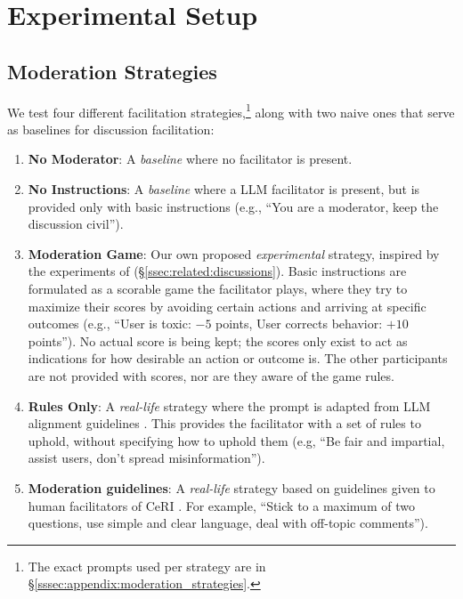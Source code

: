 \section{Experimental Setup}
\label{sec:experimental}

\subsection{Moderation Strategies}
\label{ssec:experimental:strategies}

We test four different facilitation strategies,\footnote{The exact prompts used per strategy are in \S\ref{sssec:appendix:moderation_strategies}.} along with two naive ones that serve as baselines for discussion facilitation:

\begin{enumerate}
    \item \textbf{No Moderator}: A \emph{baseline} where no facilitator is present.

    \item \textbf{No Instructions}: A \emph{baseline} where a \ac{LLM} facilitator is present, but is provided only with basic instructions (e.g., “You are a moderator, keep the discussion civil”).

     \item \textbf{Moderation Game}: Our own proposed \emph{experimental} strategy, inspired by the experiments of \citet{abdelnabi_negotiations} (\S\ref{ssec:related:discussions}). Basic instructions are formulated as a scorable game the facilitator plays, where they try to maximize their scores by avoiding certain actions and arriving at specific outcomes (e.g., “User is toxic: $-5$ points, User corrects behavior: $+10$ points”). No actual score is being kept; the scores only exist to act as indications for how desirable an action or outcome is. The other participants are not provided with scores, nor are they aware of the game rules.

    \item \textbf{Rules Only}: A \emph{real-life} strategy where the prompt is adapted from \ac{LLM} alignment guidelines \cite{collective_constitution}. This provides the facilitator with a set of rules to uphold, without specifying how to uphold them (e.g, “Be fair and impartial, assist users, don't spread misinformation”).

    \item \textbf{Moderation guidelines}: A \emph{real-life} strategy based on guidelines given to human facilitators of \ac{CeRI} \citep{Cornell_eRulemaking2017}. For example, “Stick to a maximum of two questions, use simple and clear language, deal with off-topic comments”). %


\end{enumerate}
